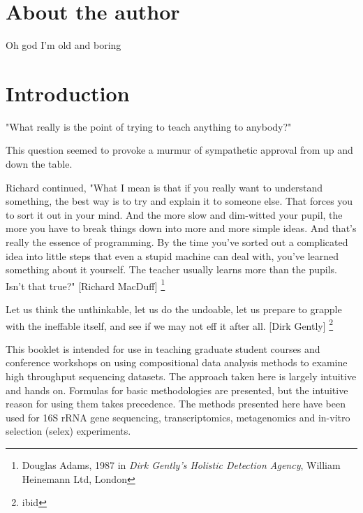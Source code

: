 \documentclass[onecolumn]{article}
\begin{document}
\hypertarget{about-the-author}{%
\section*{About the author}\label{about-the-author}}

Oh god I'm old and boring

\hypertarget{intro}{%
\section{Introduction}\label{intro}}

\hspace{2cm}\begin{minipage}[ct]{10cm}
\parskip=5pt
\parindent=5pt

"What really is the point of trying to teach anything to anybody?"

This question seemed to provoke a murmur of sympathetic approval from up and down the table.

 Richard continued, "What I mean is that if you really want to understand something, the best way is to try and explain it to someone else. That forces you to sort it out in your mind. And the more slow and dim-witted your pupil, the more you have to break things down into more and more simple ideas. And that's really the essence of programming. By the time you've sorted out a complicated idea into little steps that even a stupid machine can deal with, you've learned something about it yourself. The teacher usually learns more than the pupils. Isn't that true?" [Richard MacDuff] \footnote{Douglas Adams, 1987 in \emph{Dirk Gently's Holistic Detection Agency},  William Heinemann Ltd, London}

 \vspace{1cm}
 Let us think the unthinkable, let us do the undoable, let us prepare to grapple with the ineffable itself, and see if we may not eff it after all. [Dirk Gently] \footnote{ibid}

\end{minipage}

This booklet is intended for use in teaching graduate student courses and conference workshops on using compositional data analysis methods to examine high throughput sequencing datasets. The approach taken here is largely intuitive and hands on. Formulas for basic methodologies are presented, but the intuitive reason for using them takes precedence. The methods presented here have been used for 16S rRNA gene sequencing, transcriptomics, metagenomics and in-vitro selection (selex) experiments.
\end{document}
